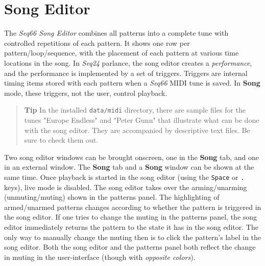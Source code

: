 %
%
%

\section{Song Editor}
\label{sec:song_editor}

   The \textsl{Seq66 Song Editor} combines all patterns
   into a complete tune with controlled repetitions of each pattern.
   It shows one row per pattern/loop/sequence,
   with the placement of each pattern at various time locations in the song.
   In \textsl{Seq24} parlance, the song editor creates a
   \textsl{performance}, and the performance is implemented by a set of
   triggers.
   Triggers are internal timing items stored with each pattern when a
   \textsl{Seq66} MIDI tune is saved.
   In \textbf{Song} mode, these triggers, not the user, control
   playback.

   \begin{quotation}
      \textbf{Tip}
      In the installed \texttt{data/midi} directory, there are sample files for
      the tunes "Europe Endless" and "Peter Gunn" that illustrate what can be
      done with the song editor.  They are accompanied by descriptive text
      files.  Be sure to check them out.
   \end{quotation}

   Two song editor windows can be
   brought onscreen, one in the \textbf{Song} tab, and
   one in an external window.
   The \textbf{Song} tab and a \textbf{Song} window can be shown at the
   same time.
   Once playback is started in the song editor (using the \texttt{Space} or
   \texttt{.} keys), live mode is disabled.
   The song editor takes over the arming/unarming (unmuting/muting)
   shown in the patterns panel.  The highlighting of armed/unarmed patterns
   changes according to whether the pattern is triggered in the song editor.
   If one tries to change the muting in
   the patterns panel, the song editor immediately returns the pattern to the
   state it has in the song editor.  The only way to manually change the muting
   then is to click the pattern's label in the song editor.
   Both the song editor and the patterns panel both reflect the change in
   muting in the user-interface (though with \textsl{opposite colors}).

